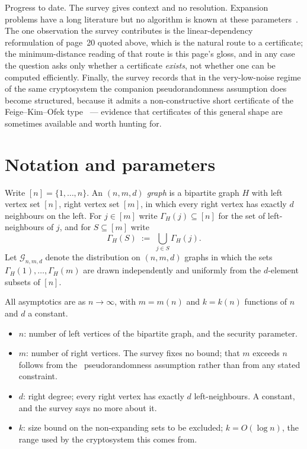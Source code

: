 \documentclass{aicr-conjecture}
\newcommand{\Gnmd}{\mathcal{G}_{n,m,d}}
\newcommand{\Nbr}{\Gamma_H}
\begin{document}
Progress to date. The survey gives context and no resolution. Expansion
problems have a long literature but no algorithm is known at these
parameters~\cite{HLW06}. The one observation the survey contributes is
the linear-dependency reformulation of page~20 quoted above, which is
the natural route to a certificate; the minimum-distance reading of
that route is this page's gloss, and in any case the question asks only
whether a certificate \emph{exists}, not whether one can be computed
efficiently. Finally, the survey records that in the very-low-noise
regime of the same cryptosystem the companion pseudorandomness
assumption does become structured, because it admits a non-constructive
short certificate of the Feige--Kim--Ofek type~\cite{FKO06} --- evidence
that certificates of this general shape are sometimes available and
worth hunting for.

\section{Notation and parameters}\label{sec:notation}

Write $[n] = \{1,\dots,n\}$. An \emph{$(n,m,d)$ graph} is a bipartite
graph $H$ with left vertex set $[n]$, right vertex set $[m]$, in which
every right vertex has exactly $d$ neighbours on the left. For
$j \in [m]$ write $\Nbr(j) \subseteq [n]$ for the set of
left-neighbours of $j$, and for $S \subseteq [m]$ write
\[
  \Nbr(S) \;:=\; \bigcup_{j \in S} \Nbr(j) .
\]
Let $\Gnmd$ denote the distribution on $(n,m,d)$ graphs in which the
sets $\Nbr(1),\dots,\Nbr(m)$ are drawn independently and uniformly from
the $d$-element subsets of $[n]$.

All asymptotics are as $n \to \infty$, with $m = m(n)$ and $k = k(n)$
functions of $n$ and $d$ a constant.

\begin{itemize}[leftmargin=1.2em]
\item $n$: number of left vertices of the bipartite graph, and the
  security parameter.
\item $m$: number of right vertices. The survey fixes no bound; that
  $m$ exceeds $n$ follows from the~\cite{ABW10} pseudorandomness
  assumption rather than from any stated constraint.
\item $d$: right degree; every right vertex has exactly $d$
  left-neighbours. A constant, and the survey says no more about it.
\item $k$: size bound on the non-expanding sets to be excluded;
  $k = O(\log n)$, the range used by the cryptosystem this comes from.
\end{itemize}
\end{document}
